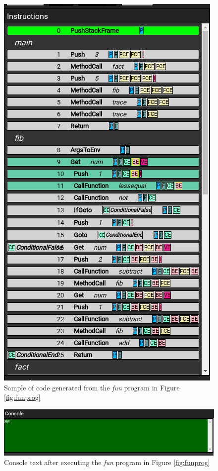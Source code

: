 \begin{figure}[H]
\centering
\includegraphics[scale=0.5]{graphics/funcode} %
\caption{Sample of code generated from the \textit{fun} program in Figure \ref{fig:funprog}}
\label{fig:funcode} %
\end{figure}

\begin{figure}[H]
\centering
\includegraphics[scale=0.5]{graphics/funconsole} %
\caption{Console text after executing the \textit{fun} program in Figure \ref{fig:funprog}}
\label{fig:funconsole} %
\end{figure}

